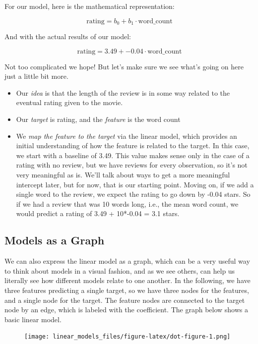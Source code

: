 \documentclass[
  letterpaper,
]{krantz}
\providecommand{\tightlist}{%
  \setlength{\itemsep}{0pt}\setlength{\parskip}{0pt}}\usepackage{longtable,booktabs,array}
\begin{document}
For our model, here is the mathematical representation:

\[
\textrm{rating} = b_0 + b_1 \cdot \textrm{word\_count}
\]

And with the actual results of our model:

\[
\textrm{rating} = 3.49 + -0.04 \cdot \textrm{word\_count}
\]

Not too complicated we hope! But let's make sure we see what's going on
here just a little bit more.

\begin{itemize}
\tightlist
\item
  Our \emph{idea} is that the length of the review is in some way
  related to the eventual rating given to the movie.
\item
  Our \emph{target} is rating, and the \emph{feature} is the word count
\item
  We \emph{map the feature to the target} via the linear model, which
  provides an initial understanding of how the feature is related to the
  target. In this case, we start with a baseline of 3.49. This value
  makes sense only in the case of a rating with no review, but we have
  reviews for every observation, so it's not very meaningful as is.
  We'll talk about ways to get a more meaningful intercept later, but
  for now, that is our starting point. Moving on, if we add a single
  word to the review, we expect the rating to go down by -0.04 stars. So
  if we had a review that was 10 words long, i.e., the mean word count,
  we would predict a rating of 3.49 + 10*-0.04 = 3.1 stars.
\end{itemize}

\subsection{Models as a Graph}\label{models-as-a-graph}

We can also express the linear model as a graph, which can be a very
useful way to think about models in a visual fashion, and as we see
others, can help us literally see how different models relate to one
another. In the following, we have three features predicting a single
target, so we have three nodes for the features, and a single node for
the target. The feature nodes are connected to the target node by an
edge, which is labeled with the coefficient. The graph below shows a
basic linear model.

\hypertarget{graph-lm}{}
\begin{figure}[H]

{\centering \texttt{[image: linear\_models\_files/figure-latex/dot-figure-1.png]}

}

\end{figure}
\end{document}
